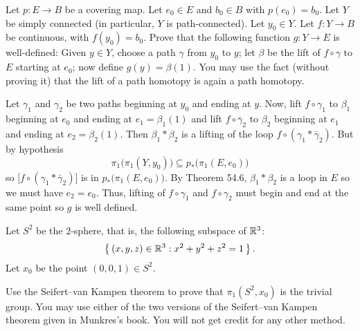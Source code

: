 \begin{problem}
  Let \(p\colon E\to B\) be a covering map. Let \(e_0\in E\) and
  \(b_0\in B\) with \(p(e_0)=b_0\). Let \(Y\) be simply connected (in
  particular, \(Y\) is path-connected). Let \(y_0\in Y\). Let
  \(f\colon Y\to B\) be continuous, with \(f(y_0)=b_0\). Prove that the
  following function \(g\colon Y\to E\) is well-defined: Given \(y\in Y\),
  choose a path \(\gamma\) from \(y_0\) to \(y\); let \(\beta\) be the lift
  of \(f\circ\gamma\) to \(E\) starting at \(e_0\); now define
  \(g(y)=\beta(1)\). You may use the fact (without proving it) that the
  lift of a path homotopy is again a path homotopy.
\end{problem}
\begin{solution}
  Let \(\gamma_1\) and \(\gamma_2\) be two paths beginning at \(y_0\) and
  ending at \(y\). Now, lift \(f\circ\gamma_1\) to \(\beta_1\) beginning at
  \(e_0\) and ending at \(e_1=\beta_1(1)\) and lift \(f\circ\bar \gamma_2\)
  to \(\beta_2\) beginning at \(e_1\) and ending at
  \(e_2=\beta_2(1)\). Then \(\beta_1*\beta_2\) is a lifting of the loop
  \(f\circ(\gamma_1*\bar\gamma_2)\). But by hypothesis
  \[
    \pi_1\bigl(\pi_1(Y,y_0)\bigr)\subseteq p_*\bigl(\pi_1(E,e_0)\bigr)
  \]
  so \(\bigl[f\circ(\gamma_1*\bar \gamma_2)\bigr]\) is in
  \(p_*\bigl(\pi_1(E,e_0)\bigr)\). By Theorem 54.6, \(\beta_1*\beta_2\) is
  a loop in \(E\) so we must have \(e_2=e_0\). Thus,  lifting of
  \(f\circ\gamma_1\) and \(f\circ\gamma_2\) must begin and end at the same
  point so \(g\) is well defined.
\end{solution}

\begin{problem}
  Let \(S^2\) be the \(2\)-sphere, that is, the following subspace of
  \(\mathbb{R}^3\):
  \[
    \left\{\,(x,y,z)\in\mathbb{R}^3:x^2+y^2+z^2=1\,\right\}.
  \]
  Let \(x_0\) be the point \((0,0,1)\in S^2\).

  Use the Seifert--van Kampen theorem to prove that \(\pi_1(S^2,x_0)\) is
  the trivial group. You may use either of the two versions of the
  Seifert--van Kampen theorem given in Munkres's book. You will not get
  credit for any other method.
\end{problem}
\begin{solution}
\end{solution}

